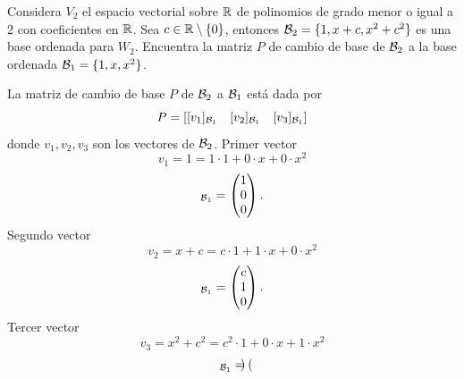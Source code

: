 \documentclass[12pt,a4paper]{article}
\begin{document}
    \begin{mdframed}[style=mdpinkbox,frametitle={Ejercicio 3}]
        Considera $V_{2}$ el espacio vectorial sobre $\mathbb{R}$ de polinomios de grado menor o igual a 2 con coeficientes en $\mathbb{R}$. Sea
        $c\in\mathbb{R}\setminus\{0\}$, entonces $\mathcal{B}_{2}=\{1,x+c,x^{2}+c^{2}\}$ es una base ordenada para $W_{2}$. Encuentra la matriz $P$
        de cambio de base de $\mathcal{B}_{2}$ a la base ordenada $\mathcal{B}_{1}=\{1,x,x^{2}\}$.
    \end{mdframed}

    \begin{solucion}
        La matriz de cambio de base $P$ de $\mathcal{B}_{2}$ a $\mathcal{B}_{1}$ está dada por
        \begin{equation*}
            P=[[v_{1}]_{\mathcal{B}_{1}}\quad[v_{2}]_{\mathcal{B}_{1}}\quad[v_{3}]_{\mathcal{B}_{1}}]
        \end{equation*}
        donde $v_{1},v_{2},v_{3}$ son los vectores de $\mathcal{B}_{2}$. Primer vector
        \begin{equation*}
            v_{1}=1=1\cdot1+0\cdot x+0\cdot x^{2}
        \end{equation*}
        \begin{equation*}
            [1]_{\BB_{1}}=
            \begin{pmatrix}
                1\\
                0\\
                0
            \end{pmatrix}.
        \end{equation*}
        Segundo vector
        \begin{equation*}
            v_{2}=x+c=c\cdot1+1\cdot x+0\cdot x^{2}
        \end{equation*}
        \begin{equation*}
            [x+c]_{\BB_{1}}=
            \begin{pmatrix}
                c\\
                1\\
                0
            \end{pmatrix}.
        \end{equation*}
        Tercer vector
        \begin{equation*}
            v_{3}=x^{2}+c^{2}=c^{2}\cdot1+0\cdot x+1\cdot x^{2}
        \end{equation*}
        \begin{equation*}
            [x^{2}+c^{2}]_{\BB_{1}}=
            \begin{pmatrix}

\end{pmatrix}
\end{equation*}
\end{solucion}
\end{document}
